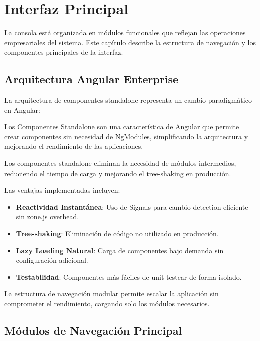 
\chapter{Interfaz Principal}

La consola está organizada en módulos funcionales que reflejan las operaciones empresariales del sistema. Este capítulo describe la estructura de navegación y los componentes principales de la interfaz.

\section{Arquitectura Angular Enterprise}

La arquitectura de componentes standalone representa un cambio paradigmático en Angular:

Los Componentes Standalone son una característica de Angular que permite crear componentes sin necesidad de NgModules, simplificando la arquitectura y mejorando el rendimiento de las aplicaciones.

Los componentes standalone eliminan la necesidad de módulos intermedios, reduciendo el tiempo de carga y mejorando el tree-shaking en producción.

Las ventajas implementadas incluyen:

\begin{itemize}
\item \textbf{Reactividad Instantánea}: Uso de Signals para cambio detection eficiente sin zone.js overhead.
\item \textbf{Tree-shaking}: Eliminación de código no utilizado en producción.
\item \textbf{Lazy Loading Natural}: Carga de componentes bajo demanda sin configuración adicional.
\item \textbf{Testabilidad}: Componentes más fáciles de unit testear de forma isolado.
\end{itemize}

La estructura de navegación modular permite escalar la aplicación sin comprometer el rendimiento, cargando solo los módulos necesarios.

\section{Módulos de Navegación Principal}

